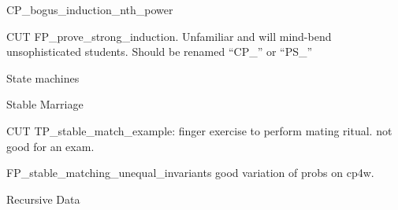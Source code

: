 \documentclass[quiz]{mcs}
\begin{document}
\begin{staffnotes}
CP\_bogus\_induction\_nth\_power
\end{staffnotes}


\begin{staffnotes}
CUT FP\_prove\_strong\_induction.  Unfamiliar and will mind-bend
unsophisticated students.  Should be renamed ``CP\_'' or ``PS\_''
\end{staffnotes}


\begin{center}
{\large State machines}
\end{center}





\begin{center}
{\large Stable Marriage}
\end{center}




\begin{staffnotes}
CUT TP\_stable\_match\_example: finger exercise to perform mating
ritual.  not good for an exam.
\end{staffnotes}

\begin{staffnotes}
FP\_stable\_matching\_unequal\_invariants good variation of probs on cp4w.
\end{staffnotes}

\begin{center}
{\large Recursive Data}
\end{center}
\end{document}
